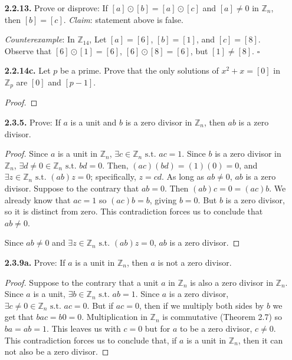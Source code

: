 \documentclass[12pt]{article}
\newcommand{\zee}{\mathbb{Z}}
\newcommand{\st}{\text{ s.t. }}
\begin{document}
\begin{itemize}
\item[\textbf{2.2.13.}] Prove or disprove: If $[a]\odot[b]=[a]\odot[c]$ and $[a]\ne 0$ in $\zee_n$, then $[b]=[c]$.
\textit{Claim}: statement above is false.
\par
\textit{Counterexample}: In $\zee_{14}$, Let $[a]=[6]$, $[b]=[1]$, and $[c]=[8]$.
Observe that $[6]\odot[1]=[6]$, $[6]\odot[8]=[6]$, but $[1]\neq[8]$.
$\square$

\item[\textbf{2.2.14c.}] Let $p$ be a prime. Prove that the only solutions of $x^2+x=[0]$ in $\zee_p$ are $[0]$ and $[p-1]$.

\begin{proof}

\end{proof}

\item[\textbf{2.3.5.}] Prove: If $a$ is a unit and $b$ is a zero divisor in $\zee_n$, then $ab$ is a zero divisor.

\begin{proof}
Since $a$ is a unit in $\zee_n$, $\exists c \in \zee_n \st ac=1$.
Since $b$ is a zero divisor in $\zee_n$, $\exists d \neq 0 \in \zee_n \st bd=0$.
Then, $(ac)(bd) = (1)(0) = 0$, and $\exists z \in \zee_n \st (ab)z = 0$; specifically, $z=cd$.
As long as $ab\neq0$, $ab$ is a zero divisor.
Suppose to the contrary that $ab=0$.
Then $(ab)c = 0 = (ac)b$.
We already know that $ac=1$ so $(ac)b=b$, giving $b=0$.
But $b$ is a zero divisor, so it is distinct from zero.
This contradiction forces us to conclude that $ab\neq0$.
\par
Since $ab\neq0$ and $\exists z \in \zee_n \st (ab)z = 0$, $ab$ is a zero divisor.
\end{proof}

\item[\textbf{2.3.9a.}] Prove: If $a$ is a unit in $\zee_n$, then $a$ is not a zero divisor.

\begin{proof}
Suppose to the contrary that a unit $a$ in $\zee_n$ is also a zero divisor in $\zee_n$.
Since $a$ is a unit, $\exists b \in \zee_n \st ab=1$.
Since $a$ is a zero divisor, $\exists c \neq 0 \in \zee_n \st ac=0$.
But if $ac=0$, then if we multiply both sides by $b$ we get that $bac = b0 = 0$.
Multiplication in $\zee_n$ is commutative (Theorem 2.7) so $ba = ab = 1$.
This leaves us with $c=0$ but for $a$ to be a zero divisor, $c\neq0$.
This contradiction forces us to conclude that, if $a$ is a unit in $\zee_n$, then it can not also be a zero divisor.
\end{proof}


\end{itemize}
\end{document}
